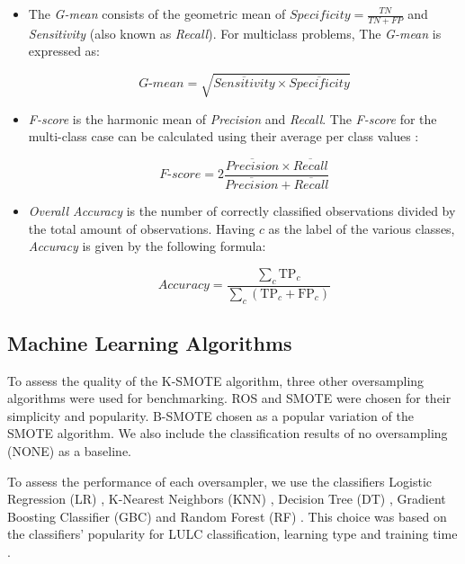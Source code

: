 \documentclass[parskip=full]{scrartcl}
\begin{document}
\begin{itemize}
	\item The \textit{G-mean} consists of the geometric mean of
	      $Specificity = \frac{TN}{TN + FP}$ and \textit{Sensitivity} (also known as \textit{Recall}). For multiclass problems, The
	      \textit{G-mean} is expressed as:

	      $$\textit{G-mean} = \sqrt{ \overline{Sensitivity} \times
			      \overline{Specificity}}$$

	\item \textit{F-score} is the harmonic mean of \textit{Precision} and
	      \textit{Recall}. The \textit{F-score} for the multi-class case can
	      be calculated using their average per class values \cite{He2009}:

	      $$\textit{F-score}=2\frac{\overline{Precision} \times \overline{Recall}}{\overline{Precision} +
			      \overline{Recall}}$$

	\item \textit{Overall Accuracy} is the number of correctly classified observations
	      divided by the total amount of observations. Having \( c \) as the label of the
	      various classes, \textit{Accuracy} is given by the following formula:

	      $$\textit{Accuracy} = \frac{ \sum\limits_{c}{ \text{TP}_{c} } }{
			      \sum\limits_{c}{ (\text{TP}_{c}  + \text{FP}_{c}) } } $$

\end{itemize}

\subsection{Machine Learning Algorithms}

To assess the quality of the K-SMOTE algorithm, three other oversampling
algorithms were used for benchmarking. ROS and SMOTE were chosen for their
simplicity and popularity. B-SMOTE chosen as a popular
variation of the SMOTE algorithm. We also include the classification
results of no oversampling (NONE) as a baseline.

To assess the performance of each oversampler, we use the classifiers Logistic
Regression (LR) \cite{Nelder1972}, K-Nearest Neighbors (KNN)
\cite{Cover1967}, Decision Tree (DT) \cite{Salzberg1994}, Gradient Boosting
Classifier (GBC) \cite{Friedman2001} and Random Forest (RF) \cite{Liaw2002}.
This choice was based on the classifiers' popularity for LULC classification,
learning type and training time \cite{Maxwell2018,Gavade2019}.
\end{document}
